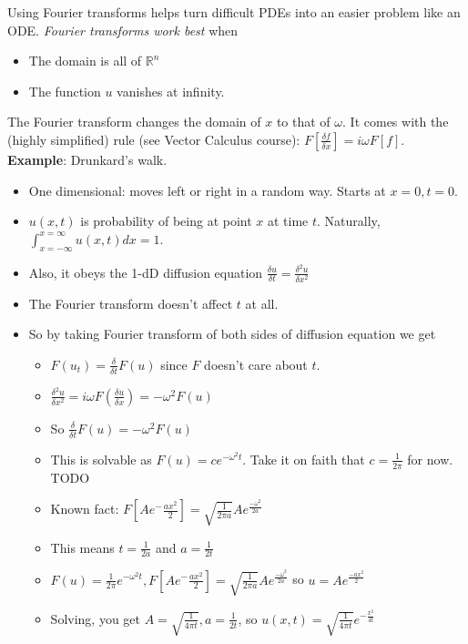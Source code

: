 \documentclass[11pt, oneside]{article}   	%
\begin{document}
Using Fourier transforms helps turn difficult PDEs into an easier problem like an ODE.  \emph{Fourier transforms work best} when 
\begin{itemize}
\item The domain is all of $\mathbb{R}^n$
\item The function $u$ vanishes at infinity.
\end{itemize}
 
The Fourier transform changes the domain of $x$ to that of $\omega$.  It comes with the (highly simplified) rule (see Vector Calculus course): $F[\frac{\delta f}{\delta x}] = i \omega F[f]$.  
\textbf{Example}: Drunkard's walk.
\begin{itemize}
\item One dimensional: moves left or right in a random way.  Starts at $x=0, t=0$.
\item $u(x,t)$ is probability of being at point $x$ at time $t$.  Naturally, $\int_{x=-\infty}^{x=\infty} u(x,t)dx = 1$.
\item Also, it obeys the 1-dD diffusion equation $\frac{\delta u}{\delta t} = \frac{\delta ^2 u}{\delta x^2}$
\item The Fourier transform doesn't affect $t$ at all.
\item So by taking Fourier transform of both sides of diffusion equation we get 
\begin{itemize}
\item $F(u_t)=  \frac{\delta}{\delta t} F(u) $ since $F$ doesn't care about $t$.
\item $\frac{\delta ^2 u}{\delta x^2} = i\omega F(\frac{\delta u}{\delta x}) = -\omega^2 F(u)$
\item So $  \frac{\delta}{\delta t} F(u)  = -\omega^2 F(u)$
\item This is solvable as $F(u) = ce^{-\omega^2 t}$.  Take it on faith that $c = \frac{1}{2\pi}$ for now. TODO
\item Known fact: $F[Ae^-{\frac{ax^2}{2}}] = \sqrt{\frac{1}{2 \pi a}} Ae^{\frac{-\omega^2}{2a}}$
\item This means $t = \frac{1}{2a}$ and $a = \frac{1}{2t}$
\item $F(u)  = 	\frac{1}{2\pi}e^{-\omega ^2 t}, F[Ae^-{\frac{ax^2}{2}}] = \sqrt{\frac{1}{2 \pi a}} Ae^{\frac{-\omega^2}{2a}}$ so $u  = Ae^{\frac{-ax^2}{2}}$
\item Solving, you get $A = \sqrt{\frac{1}{4\pi t}}, a=\frac{1}{2t}$, so $u(x,t) = \sqrt{\frac{1}{4\pi t}} e^{-\frac{x^2}{4t}}$
\end{itemize}

\end{itemize}
\end{document}

